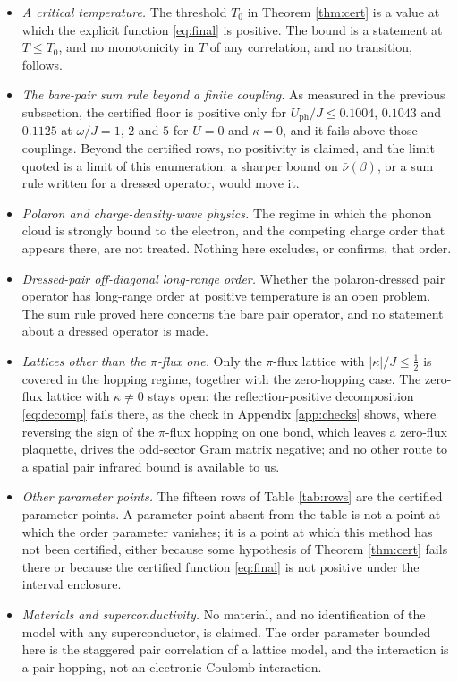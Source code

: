 \documentclass[11pt]{article}
\numberwithin{equation}{section}
\theoremstyle{definition}
\begin{document}
\begin{itemize}
\item \emph{A critical temperature.} The threshold $T_0$ in Theorem \ref{thm:cert} is a
  value at which the explicit function \eqref{eq:final} is positive. The bound is a statement at
  $T\le T_0$, and no monotonicity in $T$ of any correlation, and no transition, follows.
\item \emph{The bare-pair sum rule beyond a finite coupling.} As measured in the previous
  subsection, the certified floor is positive only for $U_{\mathrm{ph}}/J\le0.1004$,
  $0.1043$ and $0.1125$ at $\omega/J=1$, $2$ and $5$ for $U=0$ and $\kappa=0$, and it
  fails above those couplings. Beyond the certified rows, no positivity is claimed, and
  the limit quoted is a limit of this enumeration: a sharper bound on
  $\bar\nu(\beta)$, or a sum rule written for a dressed operator, would move it.
\item \emph{Polaron and charge-density-wave physics.} The regime in which the phonon cloud
  is strongly bound to the electron, and the competing charge order that appears there,
  are not treated. Nothing here excludes, or confirms, that order.
\item \emph{Dressed-pair off-diagonal long-range order.} Whether the polaron-dressed pair
  operator has long-range order at positive temperature is an open problem. The sum rule
  proved here concerns the bare pair operator, and no statement about a dressed operator
  is made.
\item \emph{Lattices other than the $\pi$-flux one.} Only the $\pi$-flux lattice with
  $|\kappa|/J\le\frac12$ is covered in the hopping regime, together with the zero-hopping
  case. The zero-flux lattice with $\kappa\ne0$ stays open: the reflection-positive
  decomposition \eqref{eq:decomp} fails there, as the check in Appendix \ref{app:checks}
  shows, where reversing the sign of the $\pi$-flux hopping on one bond, which leaves a
  zero-flux plaquette, drives the odd-sector Gram matrix negative; and no other route to
  a spatial pair infrared bound is available to us.
\item \emph{Other parameter points.} The fifteen rows of Table \ref{tab:rows} are the
  certified parameter points. A parameter point absent from the table is not a point at
  which the order parameter vanishes; it is a point at which this method has not been
  certified, either because some hypothesis of Theorem \ref{thm:cert} fails there or
  because the certified function \eqref{eq:final} is not positive under the interval enclosure.
\item \emph{Materials and superconductivity.} No material, and no identification of the
  model with any superconductor, is claimed. The order parameter bounded here is the
  staggered pair correlation of a lattice model, and the interaction is a pair hopping,
  not an electronic Coulomb interaction.
\end{itemize}
\end{document}
